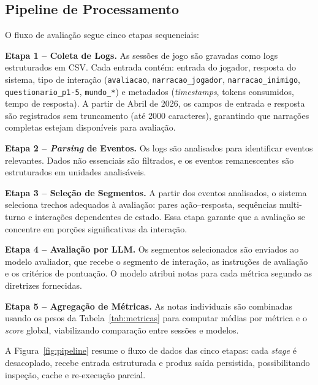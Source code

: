 \documentclass[12pt]{article}
\begin{document}
\subsection{Pipeline de Processamento}

O fluxo de avaliação segue cinco etapas sequenciais:

\textbf{Etapa 1 -- Coleta de Logs.} As sessões de jogo são gravadas como logs estruturados em CSV. Cada entrada contém: entrada do jogador, resposta do sistema, tipo de interação (\texttt{avaliacao}, \texttt{narracao\_jogador}, \texttt{narracao\_inimigo}, \texttt{questionario\_p1-5}, \texttt{mundo\_*}) e metadados (\textit{timestamps}, tokens consumidos, tempo de resposta). A partir de Abril de 2026, os campos de entrada e resposta são registrados sem truncamento (até 2000 caracteres), garantindo que narrações completas estejam disponíveis para avaliação.

\textbf{Etapa 2 -- \textit{Parsing} de Eventos.} Os logs são analisados para identificar eventos relevantes. Dados não essenciais são filtrados, e os eventos remanescentes são estruturados em unidades analisáveis.

\textbf{Etapa 3 -- Seleção de Segmentos.} A partir dos eventos analisados, o sistema seleciona trechos adequados à avaliação: pares ação--resposta, sequências multi-turno e interações dependentes de estado. Essa etapa garante que a avaliação se concentre em porções significativas da interação.

\textbf{Etapa 4 -- Avaliação por LLM.} Os segmentos selecionados são enviados ao modelo avaliador, que recebe o segmento de interação, as instruções de avaliação e os critérios de pontuação. O modelo atribui notas para cada métrica segundo as diretrizes fornecidas.

\textbf{Etapa 5 -- Agregação de Métricas.} As notas individuais são combinadas usando os pesos da Tabela~\ref{tab:metricas} para computar médias por métrica e o \textit{score} global, viabilizando comparação entre sessões e modelos.

A Figura~\ref{fig:pipeline} resume o fluxo de dados das cinco etapas: cada \textit{stage} é desacoplado, recebe entrada estruturada e produz saída persistida, possibilitando inspeção, cache e re-execução parcial.
\end{document}
